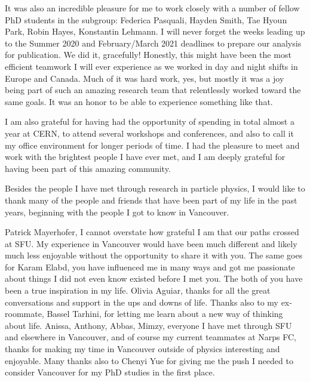 It was also an incredible pleasure for me to work closely with a number of fellow PhD students in the \HWW subgroup: 
Federica Pasquali, Hayden Smith, Tae Hyoun Park, Robin Hayes, Konstantin Lehmann. 
I will never forget the weeks leading up to the Summer 2020 and February/March 2021 deadlines to prepare our analysis for publication. We did it, gracefully!
Honestly, this might have been the most efficient teamwork I will ever experience as we worked in day and night shifts in Europe and Canada. 
Much of it was hard work, yes, but mostly it was a joy being part of such an amazing research team that relentlessly worked toward the same goals. It was an honor to be able to experience something like that. 

I am also grateful for having had the opportunity of spending in total almost a year at CERN, to attend several workshops and conferences, and also to call it my office environment for longer periods of time. 
I had the pleasure to meet and work with the brightest people I have ever met, and I am deeply grateful for having been part of this amazing community. 

Besides the people I have met through research in particle physics, I would like to thank many of the people and friends that have been part of my life in the past years, beginning with the people I got to know in Vancouver. 

Patrick Mayerhofer, I cannot overstate how grateful I am that our paths crossed at SFU. My experience in Vancouver would have been much different and likely much less enjoyable without the opportunity to share it with you.
The same goes for Karam Elabd, you have influenced me in many ways and got me passionate about things I did not even know existed before I met you. The both of you have been a true inspiration in my life.
Olivia Aguiar, thanks for all the great conversations and support in the ups and downs of life. 
Thanks also to my ex-roommate, Bassel Tarhini, for letting me learn about a new way of thinking about life. 
Anissa, Anthony, Abbas, Mimzy, everyone I have met through SFU and elsewhere in Vancouver, and of course my current teammates at Narps FC, thanks for making my time in Vancouver outside of physics interesting and enjoyable. 
Many thanks also to Chenyi Yue for giving me the push I needed to consider Vancouver for my PhD studies in the first place. 

